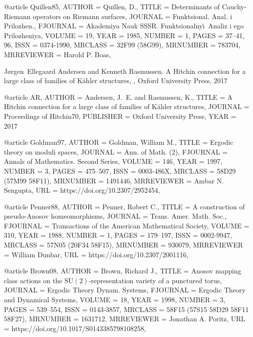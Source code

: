 @article {Quillen85,
    AUTHOR = {Quillen, D.},
     TITLE = {Determinants of {C}auchy-{R}iemann operators on {R}iemann
              surfaces},
   JOURNAL = {Funktsional. Anal. i Prilozhen.},
  FJOURNAL = {Akademiya Nauk SSSR. Funktsional\cprime ny\u\i \ Analiz i ego
              Prilozheniya},
    VOLUME = {19},
      YEAR = {1985},
    NUMBER = {1},
     PAGES = {37--41, 96},
      ISSN = {0374-1990},
   MRCLASS = {32F99 (58G99)},
  MRNUMBER = {783704},
MRREVIEWER = {Harold P. Boas},
}

 J\o{}rgen~Ellegaard Andersen and Kenneth Rasmussen.
\newblock A Hitchin connection for a large class of families of K\"{a}hler structures,
, Oxford University Press, 2017

@article {AR,
    AUTHOR = {Andersen, J.~E. and Rasmussen, K.},
     TITLE = {A Hitchin connection for a large class of families of K\"{a}hler structures},
   JOURNAL = {Proceedings of Hitchin70},
   PUBLISHER = {Oxford University Press},
   YEAR = {2017}
}

@article {Goldman97,
    AUTHOR = {Goldman, William M.},
     TITLE = {Ergodic theory on moduli spaces},
   JOURNAL = {Ann. of Math. (2)},
  FJOURNAL = {Annals of Mathematics. Second Series},
    VOLUME = {146},
      YEAR = {1997},
    NUMBER = {3},
     PAGES = {475--507},
      ISSN = {0003-486X},
   MRCLASS = {58D29 (57M99 58F11)},
  MRNUMBER = {1491446},
MRREVIEWER = {Ambar N. Sengupta},
       URL = {https://doi.org/10.2307/2952454},
}

@article {Penner88,
    AUTHOR = {Penner, Robert C.},
     TITLE = {A construction of pseudo-{A}nosov homeomorphisms},
   JOURNAL = {Trans. Amer. Math. Soc.},
  FJOURNAL = {Transactions of the American Mathematical Society},
    VOLUME = {310},
      YEAR = {1988},
    NUMBER = {1},
     PAGES = {179--197},
      ISSN = {0002-9947},
   MRCLASS = {57N05 (20F34 58F15)},
  MRNUMBER = {930079},
MRREVIEWER = {William Dunbar},
       URL = {https://doi.org/10.2307/2001116},
}

@article {Brown08,
    AUTHOR = {Brown, Richard J.},
     TITLE = {Anosov mapping class actions on the {$\text{
              SU}(2)$}-representation variety of a punctured torus},
   JOURNAL = {Ergodic Theory Dynam. Systems},
  FJOURNAL = {Ergodic Theory and Dynamical Systems},
    VOLUME = {18},
      YEAR = {1998},
    NUMBER = {3},
     PAGES = {539--554},
      ISSN = {0143-3857},
   MRCLASS = {58F15 (57S15 58D29 58F11 58F27)},
  MRNUMBER = {1631712},
MRREVIEWER = {Jonathan A. Poritz},
       URL = {https://doi.org/10.1017/S0143385798108258},
}

